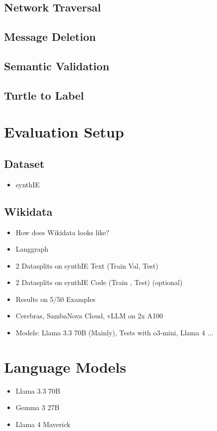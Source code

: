 \documentclass[a4paper,oneside,bibliography=totoc]{scrbook}
\begin{document}
\subsection{Network Traversal}
\label{subsec:network_traversal}
\subsection{Message Deletion}
\label{subsec:message_deletion}
\subsection{Semantic Validation}
\label{subsec:semantic_validation}
\subsection{Turtle to Label}
\label{subsec:turtle_to_label}
\section{Evaluation Setup}
\label{sec:evaluation_setup}
\subsection{Dataset}
\label{sec:dataset}
\begin{itemize}
  \item synthIE
\end{itemize}
\subsection{Wikidata}
\label{sec:wikidata}
\begin{itemize}
  \item How does Wikidata looks like?
\end{itemize}
\begin{itemize}
  \item Langgraph
  \item 2 Datasplits on synthIE Text (Train Val, Test)
  \item 2 Datasplits on synthIE Code (Train , Test) (optional)
  \item Results on 5/50 Examples
  \item Cerebras, SambaNova Cloud, vLLM on 2x A100
  \item Models: Llama 3.3 70B (Mainly), Tests with o3-mini, Llama 4 ...
\end{itemize}
\section{Language Models}
\begin{itemize}
  \item Llama 3.3 70B
  \item Gemma 3 27B
  \item Llama 4 Maverick
\end{itemize}
\end{document}
